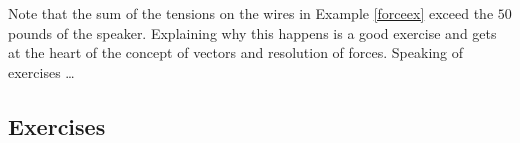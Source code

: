 \documentclass{ximera}
\begin{document}
Note that the sum of the tensions on the wires in Example \ref{forceex} exceed the $50$ pounds of the speaker.  Explaining why this happens is a good exercise and gets at the heart of the concept of vectors and resolution of forces.  Speaking of exercises \ldots


\newpage

\subsection{Exercises}


\closegraphsfile
\end{document}
